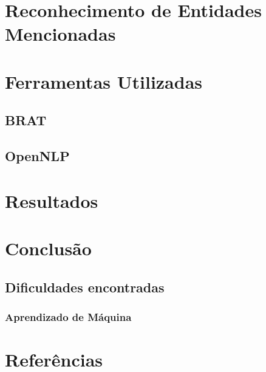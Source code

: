 \documentclass[11pt]{report}
\begin{document}
\pagebreak
\section{Reconhecimento de Entidades Mencionadas}

\pagebreak
\section{Ferramentas Utilizadas}

\subsection{BRAT}

\subsection{OpenNLP}

\pagebreak
\section{Resultados}

\pagebreak
\section{Conclusão}
\subsection{Dificuldades encontradas}
\subsubsection{Aprendizado de Máquina}

\pagebreak
\section{Referências}
\end{document}
